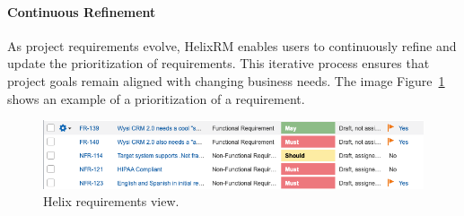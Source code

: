 \paragraph{Continuous Refinement}
As project requirements evolve, HelixRM enables users to continuously refine and update the prioritization of requirements.
This iterative process ensures that project goals remain aligned with changing business needs.
The image Figure~\ref{fig:requirements_view} shows an example of a prioritization of a requirement.
\begin{figure}[htpb]
    \centering
    \includegraphics[width=\linewidth]{images/prioritize-example}
    \caption{Helix requirements view.}
    \label{fig:requirements_view}
\end{figure}